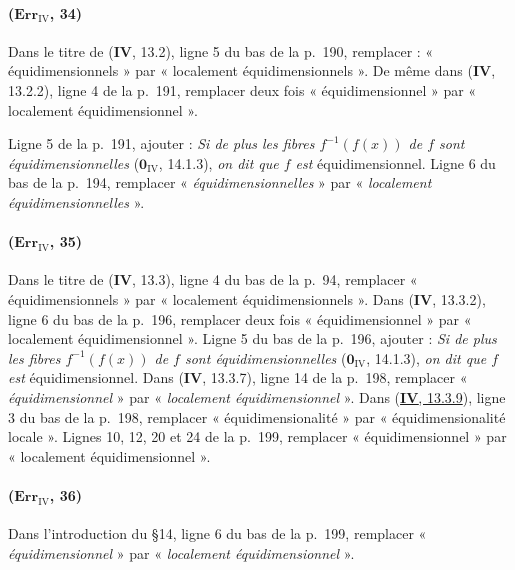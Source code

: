 \paragraph{($\mathbf{Err}_{\mathrm{IV}}$, 34)}
Dans le titre de (\textbf{IV}, 13.2), ligne 5 du bas de la p.~190, remplacer :
« équidimensionnels » par « localement équidimensionnels ». De même
dans (\textbf{IV}, 13.2.2), ligne 4 de la p.~191, remplacer deux fois
« équidimensionnel » par « localement équidimensionnel ».

Ligne 5 de la p.~191, ajouter : \emph{Si de plus les fibres
$f^{-1}(f(x))$ de $f$ sont équidimensionnelles} ($\mathbf{0}_{\mathrm{IV}}$,
14.1.3), \emph{on dit que $f$ est} équidimensionnel. Ligne 6 du bas de la
p.~194, remplacer « \emph{équidimensionnelles} » par « \emph{localement
équidimensionnelles} ».

\paragraph{($\mathbf{Err}_{\mathrm{IV}}$, 35)}
Dans le titre de (\textbf{IV}, 13.3), ligne 4 du bas de la p.~94, remplacer
« équidimensionnels » par « localement équidimensionnels ». Dans
(\textbf{IV}, 13.3.2), ligne 6 du bas de la p.~196, remplacer deux fois
« équidimensionnel » par « localement équidimensionnel ». Ligne 5 du bas
de la p.~196, ajouter : \emph{Si de plus les fibres $f^{-1}(f(x))$ de
$f$ sont équidimensionnelles} ($\mathbf{0}_{\mathrm{IV}}$, 14.1.3), \emph{on dit que
$f$ est} équidimensionnel. Dans (\textbf{IV}, 13.3.7), ligne 14 de la p.~198,
remplacer « \emph{équidimensionnel} » par « \emph{localement équidimensionnel} ».
Dans ({\hyperref[canon-index.ega4.c04.statement.13-3-9]{\textbf{IV}, 13.3.9}}), ligne 3 du
bas de la p.~198, remplacer « équidimensionalité » par
« équidimensionalité locale ». Lignes 10, 12, 20 et 24 de la p.~199,
remplacer « équidimensionnel » par « localement équidimensionnel ».

\paragraph{($\mathbf{Err}_{\mathrm{IV}}$, 36)}
Dans l'introduction du \S14, ligne 6 du bas de la p.~199, remplacer
« \emph{équidimensionnel} » par « \emph{localement équidimensionnel} ».

